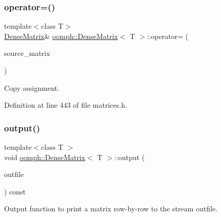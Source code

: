 \mbox{\label{classoomph_1_1DenseMatrix_a01cb48599a5ecdfca9fd02bcdd43bf88}} 
\subsubsection{\texorpdfstring{operator=()}{operator=()}}
{\footnotesize\ttfamily template$<$class T$>$ \\
\hyperlink{classoomph_1_1DenseMatrix}{Dense\+Matrix}\& \hyperlink{classoomph_1_1DenseMatrix}{oomph\+::\+Dense\+Matrix}$<$ T $>$\+::operator= (\begin{DoxyParamCaption}\item[{const \hyperlink{classoomph_1_1DenseMatrix}{Dense\+Matrix}$<$ T $>$ \&}]{source\+\_\+matrix }\end{DoxyParamCaption})\hspace{0.3cm}{\ttfamily [inline]}}



Copy assignment. 



Definition at line 443 of file matrices.\+h.

\mbox{\label{classoomph_1_1DenseMatrix_a03e20626e889a1ab4582614f55784165}} 
\subsubsection{\texorpdfstring{output()}{output()}\hspace{0.1cm}{\footnotesize\ttfamily [1/2]}}
{\footnotesize\ttfamily template$<$class T $>$ \\
void \hyperlink{classoomph_1_1DenseMatrix}{oomph\+::\+Dense\+Matrix}$<$ T $>$\+::output (\begin{DoxyParamCaption}\item[{std\+::ostream \&}]{outfile }\end{DoxyParamCaption}) const\hspace{0.3cm}{\ttfamily [virtual]}}



Output function to print a matrix row-\/by-\/row to the stream outfile. 




